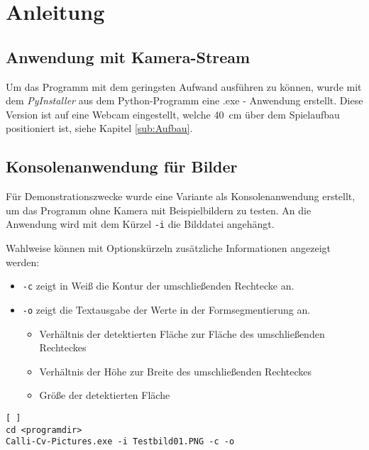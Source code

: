 
\section{Anleitung}
\label{sec:Anleitung}

\subsection{Anwendung mit Kamera-Stream}
Um das Programm mit dem geringsten Aufwand ausführen zu können, wurde mit dem \emph{PyInstaller} aus dem Python-Programm eine .exe - Anwendung erstellt. Diese Version ist auf eine Webcam eingestellt, welche 40~cm über dem Spielaufbau positioniert ist, siehe Kapitel \ref{sub:Aufbau}.


\subsection{Konsolenanwendung für Bilder}
Für Demonstrationszwecke wurde eine Variante als Konsolenanwendung erstellt, um das Programm ohne Kamera mit Beispielbildern zu testen. 
An die Anwendung wird mit dem Kürzel \lstinline{-i} die Bilddatei angehängt.
 
Wahlweise können mit Optionskürzeln zusätzliche Informationen angezeigt werden:
\begin{itemize}
\item \lstinline{-c} zeigt in Weiß die Kontur der umschließenden Rechtecke an. 
\item \lstinline{-o} zeigt die Textausgabe der Werte in der Formsegmentierung an.
\begin{itemize}
\item Verhältnis der detektierten Fläche zur Fläche des umschließenden Rechteckes
\item Verhältnis der Höhe zur Breite des umschließenden Rechteckes
\item Größe der detektierten Fläche
\end{itemize}
\end{itemize}
\begin{lstlisting}[ ]
cd <programdir>
Calli-Cv-Pictures.exe -i Testbild01.PNG -c -o
\end{lstlisting}
